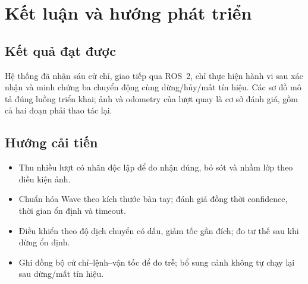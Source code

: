 \documentclass[12pt,a4paper]{article}
\begin{document}
\section{Kết luận và hướng phát triển}
\subsection{Kết quả đạt được}
Hệ thống đã nhận sáu cử chỉ, giao tiếp qua ROS~2, chỉ thực hiện hành vi sau xác nhận và minh chứng ba chuyển động cùng dừng/hủy/mất tín hiệu. Các sơ đồ mô tả đúng luồng triển khai; ảnh và odometry của lượt quay là cơ sở đánh giá, gồm cả hai đoạn phải thao tác lại.
\subsection{Hướng cải tiến}
\begin{itemize}
\item Thu nhiều lượt có nhãn độc lập để đo nhận đúng, bỏ sót và nhầm lớp theo điều kiện ảnh.
\item Chuẩn hóa Wave theo kích thước bàn tay; đánh giá đồng thời confidence, thời gian ổn định và timeout.
\item Điều khiển theo độ dịch chuyển có dấu, giảm tốc gần đích; đo tư thế sau khi dừng ổn định.
\item Ghi đồng bộ cử chỉ--lệnh--vận tốc để đo trễ; bổ sung cảnh không tự chạy lại sau dừng/mất tín hiệu.
\end{itemize}
\end{document}
